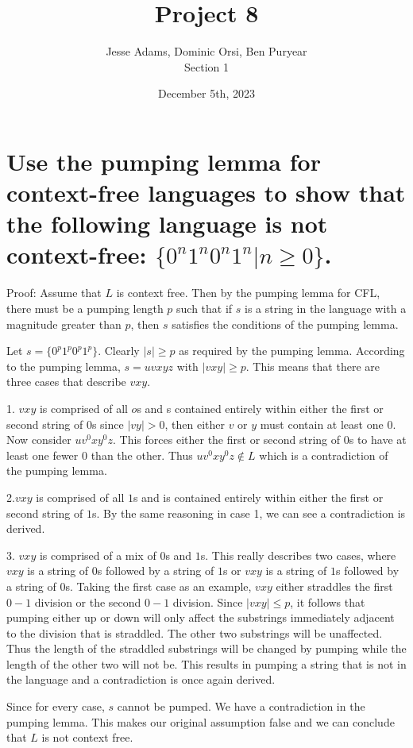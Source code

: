 \documentclass{article}
\title{Project 8}
\author{Jesse Adams, Dominic Orsi, Ben Puryear\\Section 1}
\date{December 5th, 2023}
\begin{document}
\maketitle

\section{Use the pumping lemma for context-free languages to show that the following language is not context-free:  $\{0^n 1^n 0^n 1^n | n \ge 0\}$.}

Proof: Assume that $L$ is context free. Then by the pumping lemma for CFL, there must be a pumping length $p$ such that if $s$ is a string in the language with a magnitude greater than $p$, then $s$ satisfies the conditions of the pumping lemma.

Let $s = \{0^p 1^p 0^p 1^p\}$. Clearly $|s| \ge p$ as required by the pumping lemma. According to the pumping lemma, $s=uvxyz$ with $|vxy| \ge p$. This means that there are three cases that describe $vxy$.

1. $vxy$ is comprised of all $o$s and s contained entirely within either the first or second string of $0$s since $|vy| > 0$, then either $v$ or $y$ must contain at least one $0$. Now consider $u v^0 x y^0 z$. This forces either the first or second string of $0$s to have at least one fewer $0$ than the other. Thus $u v^0 x y^0 z \notin L$ which is a contradiction of the pumping lemma.

2.$vxy$ is comprised of all $1$s and is contained entirely within either the first or second string of $1$s. By the same reasoning in case 1, we can see a contradiction is derived.

3. $vxy$ is comprised of a mix of $0$s and $1$s. This really describes two cases, where $vxy$ is a string of $0$s followed by a string of $1$s or $vxy$ is a string of $1$s followed by a string of $0$s. Taking the first case as an example, $vxy$ either straddles the first $0-1$ division or the second $0-1$ division. Since $|vxy| \le p$, it follows that pumping either up or down will only affect the substrings immediately adjacent to the division that is straddled. The other two substrings will be unaffected. Thus the length of the straddled substrings will be changed by pumping while the length of the other two will not be. This results in pumping a string that is not in the language and a contradiction is once again derived.

Since for every case, $s$ cannot be pumped. We have a contradiction in the pumping lemma. This makes our original assumption false and we can conclude that $L$ is not context free.
\end{document}
